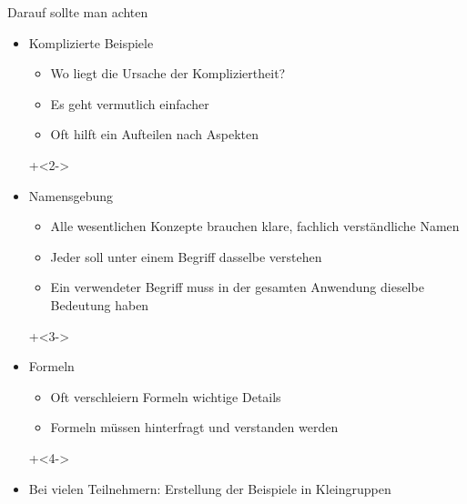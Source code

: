 \begin{frame}{Darauf sollte man achten}

\begin{itemize}
	\item Komplizierte Beispiele
	\begin{itemize}
		\item Wo liegt die Ursache der Kompliziertheit?
		\item Es geht vermutlich einfacher
		\item Oft hilft ein Aufteilen nach Aspekten
	\end{itemize}
	
\onslide+<2->
	
	\item Namensgebung
	\begin{itemize}
		\item Alle wesentlichen Konzepte brauchen klare, fachlich verständliche Namen
		\item Jeder soll unter einem Begriff dasselbe verstehen
		\item Ein verwendeter Begriff muss in der gesamten Anwendung dieselbe Bedeutung haben
	\end{itemize}
	
\onslide+<3->
	
	\item Formeln
	\begin{itemize}
		\item Oft verschleiern Formeln wichtige Details
		\item Formeln müssen hinterfragt und verstanden werden
	\end{itemize}
	
\onslide+<4->
	
	\item Bei vielen Teilnehmern: Erstellung der Beispiele in Kleingruppen
\end{itemize}

\end{frame}



